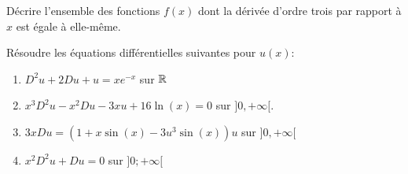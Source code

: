 \begin{exercice}
     Décrire l'ensemble des fonctions $f(x)$ dont la dérivée d'ordre trois par
     rapport à $x$ est égale à elle-même. 
\end{exercice}

\begin{exercice}
    R\'{e}soudre les \'{e}quations diff\'{e}rentielles suivantes pour $u(x)$:
\begin{enumerate}[(1)]
\item $D^2u+2Du+u=xe^{-x}$ sur $\mathbb{R}$
\item $x^3D^2u-x^2Du-3xu+16\ln(x)=0$ sur $]0,+\infty[$.
\item $3xDu=(1+x\sin(x)-3u^{3}\sin(x))u$\; sur $]0,+\infty[$
\item $x^2 D^2u + Du =0$ sur $]0;+\infty[$
\end{enumerate} 
\end{exercice}



